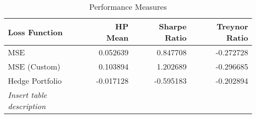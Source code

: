 \begin{table}[H]
     \centering
\begin{tabular}{lrrr}
\toprule
     Loss Function &   HP Mean &  Sharpe Ratio &  Treynor Ratio \\
\midrule
MSE &  0.052639 &      0.847708 &      -0.272728 \\
       MSE (Custom) &  0.103894 &      1.202689 &      -0.296685 \\
         Hedge Portfolio & -0.017128 &     -0.595183 &      -0.202894 \\[1ex]
\bottomrule
\textit{Insert table description} \\
\end{tabular}
\caption{Performance Measures}
\label{performance-metrics}
\end{table}

